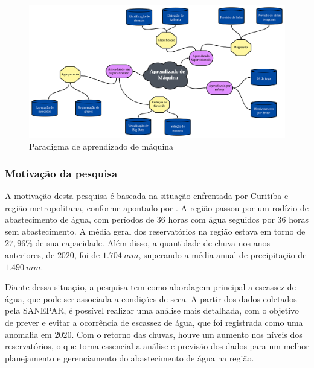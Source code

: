\begin{figure}[!hb]
	\centering
	\caption{Paradigma de aprendizado de máquina}
	\includegraphics[width=1\linewidth]{Introducao/Figuras/paradigma-ml}
	
	\label{fig:paradigma-ml}
\end{figure}
  
      
\subsubsection{Motiva\c c\~ao da pesquisa} \label{subsubsec:motivacao}
 
 
 	A motivação desta pesquisa é baseada na situação enfrentada por Curitiba e região metropolitana, conforme apontado por . A região passou por um rodízio de abastecimento de água, com períodos de 36 horas com água seguidos por 36 horas sem abastecimento. A média geral dos reservatórios na região estava em torno de $27,96\%$ de sua capacidade. Além disso, a quantidade de chuva nos anos anteriores, de $2020$, foi de $1.704 \ mm$, superando a média anual de precipitação de $1.490 \ mm$.
 	
 	Diante dessa situação, a pesquisa tem como abordagem principal a escassez de água, que pode ser associada a condições de seca. A partir dos dados coletados pela SANEPAR, é possível realizar uma análise mais detalhada, com o objetivo de prever e evitar a ocorrência de escassez de água, que foi registrada como uma anomalia em $2020$. Com o retorno das chuvas, houve um aumento nos níveis dos reservatórios, o que torna essencial a análise e previsão dos dados para um melhor planejamento e gerenciamento do abastecimento de água na região.
    
     
    